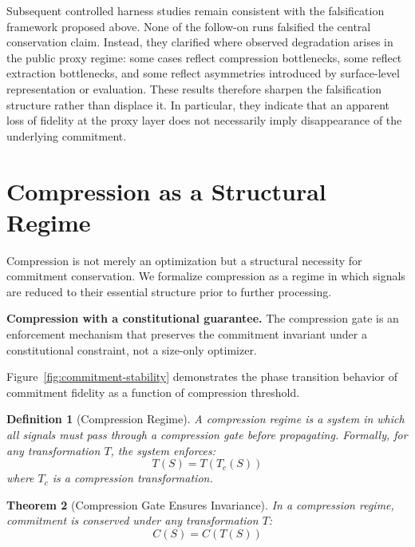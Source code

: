 \documentclass[11pt,a4paper]{article}
\newtheorem{theorem}{Theorem}[section]
\newtheorem{definition}[theorem]{Definition}
\begin{document}
Subsequent controlled harness studies remain consistent with the falsification framework proposed above. None of the follow-on runs falsified the central conservation claim. Instead, they clarified where observed degradation arises in the public proxy regime: some cases reflect compression bottlenecks, some reflect extraction bottlenecks, and some reflect asymmetries introduced by surface-level representation or evaluation. These results therefore sharpen the falsification structure rather than displace it. In particular, they indicate that an apparent loss of fidelity at the proxy layer does not necessarily imply disappearance of the underlying commitment.

\section{Compression as a Structural Regime}
\label{sec:compression}

Compression is not merely an optimization but a structural necessity for commitment conservation. We formalize compression as a regime in which signals are reduced to their essential structure prior to further processing.

\noindent\textbf{Compression with a constitutional guarantee.} The compression gate is an enforcement mechanism that preserves the commitment invariant under a constitutional constraint, not a size-only optimizer.

Figure~\ref{fig:commitment-stability} demonstrates the phase transition behavior of commitment fidelity as a function of compression threshold.



\begin{definition}[Compression Regime]
A compression regime is a system in which all signals must pass through a compression gate before propagating. Formally, for any transformation $T$, the system enforces:
\begin{equation}
T(S) = T(T_c(S))
\end{equation}
where $T_c$ is a compression transformation.
\end{definition}

\begin{theorem}[Compression Gate Ensures Invariance]
\label{thm:gate}
In a compression regime, commitment is conserved under any transformation $T$:
\begin{equation}
C(S) = C(T(S))
\end{equation}
\end{theorem}
\end{document}
